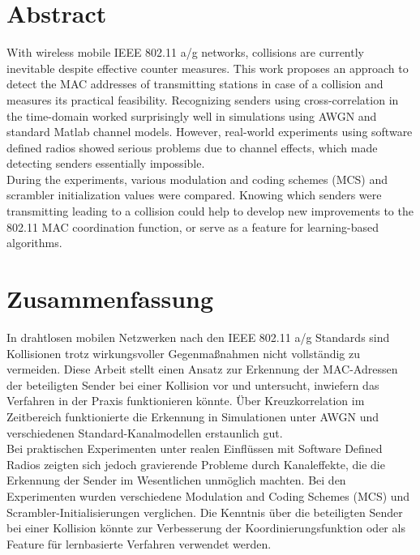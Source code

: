 

\begingroup
\let\clearpage\relax
\let\cleardoublepage\relax
\let\cleardoublepage\relax

\chapter*{Abstract}

With wireless mobile IEEE 802.11 a/g networks, collisions are currently inevitable despite effective counter measures. This work proposes an approach to detect the MAC addresses of transmitting stations in case of a collision and measures its practical feasibility. Recognizing senders using cross-correlation in the time-domain worked surprisingly well in simulations using AWGN and standard Matlab channel models. However, real-world experiments using software defined radios showed serious problems due to channel effects, which made detecting senders essentially impossible.\\

During the experiments, various modulation and coding schemes (MCS) and scrambler initialization values were compared. Knowing which senders were transmitting leading to a collision could help to develop new improvements to the 802.11 MAC coordination function, or serve as a feature for learning-based algorithms.



\vfill
{}
\chapter*{Zusammenfassung}

In drahtlosen mobilen Netzwerken nach den IEEE 802.11 a/g Standards sind Kollisionen trotz wirkungsvoller Gegenmaßnahmen nicht vollständig zu vermeiden. Diese Arbeit stellt einen Ansatz zur Erkennung der MAC-Adressen der beteiligten Sender bei einer Kollision vor und untersucht, inwiefern das Verfahren in der Praxis funktionieren könnte. Über Kreuzkorrelation im Zeitbereich funktionierte die Erkennung in Simulationen unter AWGN und verschiedenen Standard-Kanalmodellen erstaunlich gut.\\

Bei praktischen Experimenten unter realen Einflüssen mit Software Defined Radios zeigten sich jedoch gravierende Probleme durch Kanaleffekte, die die Erkennung der Sender im Wesentlichen unmöglich machten. Bei den Experimenten wurden verschiedene Modulation and Coding Schemes (MCS) und Scrambler-Initialisierungen verglichen. Die Kenntnis über die beteiligten Sender bei einer Kollision könnte zur Verbesserung der Koordinierungsfunktion oder als Feature für lernbasierte Verfahren verwendet werden.


\endgroup
\vfill
